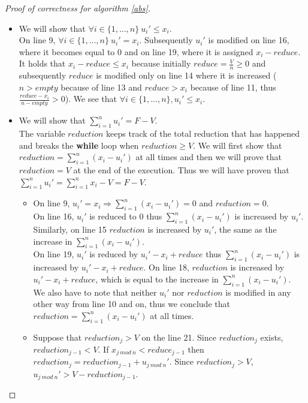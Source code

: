 \documentclass[11pt]{article}
\theoremstyle{definition}
\theoremstyle{corollary}
\begin{document}
    \begin{proof}[Proof of correctness for algorithm \ref{abs}] \
       \begin{itemize}
          \item We will show that $\forall i \in \{1,...,n\} \: u_i' \leq x_i$. \\
          On line 9, $\forall i \in \{1,...,n\} \: u_i' = x_i$. Subsequently $u_i'$ is modified on line 16, where
          it becomes equal to 0 and on line 19, where it is assigned $x_i - reduce$. It holds that $x_i - reduce \leq x_i$
          because initially $reduce = \frac{V}{n} \geq 0$ and subsequently $reduce$ is modified only on line 14 where it
          is increased ($n > empty$ because of line 13 and $reduce > x_i$ because of line 11, thus
          $\frac{reduce - x_i}{n - empty} > 0$). We see that $\forall i \in \{1,...,n\}, u_i' \leq x_i$.
          \item We will show that $\sum\limits_{i=1}^{n}u_i' = F - V$. \\
          The variable $reduction$ keeps track of the total reduction that has happened and breaks the \textbf{while} loop
          when $reduction \geq V$. We will first show that $reduction = \sum\limits_{i=1}^{n}(x_i- u_i')$ at all times and
          then we will prove that $reduction = V$ at the end of the execution. Thus we will have proven that
          $\sum\limits_{i=1}^{n}u_i'= \sum\limits_{i=1}^{n}x_i - V = F - V$.
          \begin{itemize}
             \item On line 9, $u_i' = x_i \Rightarrow \sum\limits_{i=1}^{n}(x_i- u_i') = 0$ and $reduction = 0$. \\
             On line 16, $u_i'$ is reduced to 0 thus $\sum\limits_{i=1}^{n}(x_i- u_i')$ is increased by $u_i'$.
             Similarly, on line 15 $reduction$ is increased by $u_i'$, the same as the increase in
             $\sum\limits_{i=1}^{n}(x_i- u_i')$. \\
             On line 19, $u_i'$ is reduced by $u_i' - x_i + reduce$ thus $\sum\limits_{i=1}^{n}(x_i- u_i')$ is increased
             by $u_i' - x_i + reduce$. On line 18, $reduction$ is increased by $u_i' - x_i + reduce$, which is equal
             to the increase in $\sum\limits_{i=1}^{n}(x_i- u_i')$. \\
             We also have to note that neither $u_i'$ nor $reduction$ is modified in any other way from line 10 and on,
             thus we conclude that $reduction = \sum\limits_{i=1}^{n}(x_i- u_i')$ at all times.
             \item Suppose that $reduction_j > V$ on the line 21. Since $reduction_j$ exists, $reduction_{j-1} < V$.
             If $x_{j \: mod \: n} < reduce_{j-1}$ then $reduction_j = reduction_{j-1} + u_{j \: mod \:n}'$.
             Since $reduction_j > V$, $u_{j \: mod \:n}' > V - reduction_{j-1}$. \\
             
          \end{itemize}
       \end{itemize}
    \end{proof}
\end{document}
